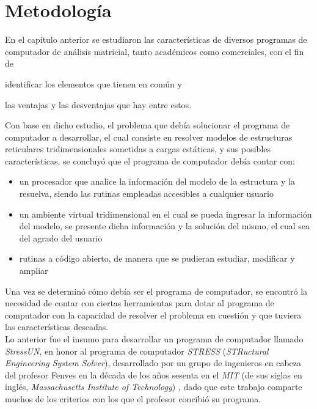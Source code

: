 \chapter{Metodología}
\label{chap:metodologia}
En el capítulo anterior se estudiaron las características de diversos programas de computador de análisis matricial, tanto académicos como comerciales, con el fin de
\begin{inparaenum}[$ (a) $]
    \item identificar los elementos que tienen en común y
    \item las ventajas y las desventajas que hay entre estos. \\
\end{inparaenum}

Con base en dicho estudio, el problema que debía solucionar el programa de computador a desarrollar, el cual consiste en resolver modelos de estructuras reticulares tridimensionales sometidas a cargas estáticas, y sus posibles características, se concluyó que el programa de computador debía contar con:

\begin{itemize}
    \item un procesador que analice la información del modelo de la estructura y la resuelva, siendo las rutinas empleadas accesibles a cualquier usuario
    
    \item un ambiente virtual tridimensional en el cual se pueda ingresar la información del modelo, se presente dicha información y la solución del mismo, el cual sea del agrado del usuario
    
    \item rutinas a código abierto, de manera que se pudieran estudiar, modificar y ampliar
\end{itemize} 

Una vez se determinó cómo debía ser el programa de computador, se encontró la necesidad de contar con  ciertas herramientas para dotar al programa de computador con la capacidad de resolver el problema en cuestión y que tuviera las características deseadas. \\

Lo anterior fue el insumo para desarrollar un programa de computador llamado \textit{StressUN}, en honor al programa de computador \textit{STRESS} (\textit{STRuctural Engineering System Solver}), desarrollado por un grupo de ingenieros en cabeza del profesor Fenves en la década de los años sesenta en el \textit{MIT} (de sus siglas en inglés, \textit{Massachusetts Institute of Technology}) \cite{fenves1965referenceUser}, dado que este trabajo comparte muchos de los criterios con los que el profesor concibió su programa. \\

